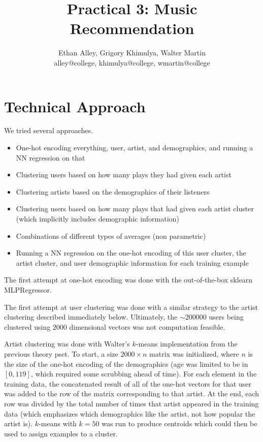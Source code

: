 \documentclass[11pt]{article}
\title{Practical 3: Music Recommendation}
\author{Ethan Alley, Grigory Khimulya, Walter Martin \\ 
alley@college, khimulya@college, wmartin@college }
\begin{document}
\maketitle{}


\section{Technical Approach}

We tried several approaches.
\begin{itemize}
	\item One-hot encoding everything, user, artist, and demographics, and running a NN regression on that
	\item Clustering users based on how many plays they had given each artist
	\item Clustering artists based on the demographics of their listeners
	\item Clustering users based on how many plays that had given each artist cluster (which implicitly includes demographic information)
	\item Combinations of different types of averages (non parametric)
	\item Running a NN regression on the one-hot encoding of this user cluster, the artist cluster, and user demographic information for each training example
\end{itemize}

\noindent The first attempt at one-hot encoding was done with the out-of-the-box sklearn MLPRegressor. 

The first attempt at user clustering was done with a similar strategy to the artist clustering described immediately below. Ultimately, the $\sim200000$ users being clustered using $2000$ dimensional vectors was not computation feasible.

Artist clustering was done with Walter's $k$-means implementation from the previous theory pset. To start, a size $2000 \times n$ matrix was initialized, where $n$ is the size of the one-hot encoding of the demographics (age was limited to be in $[0, 119]$, which required some scrubbing ahead of time). For each element in the training data, the concatenated result of all of the one-hot vectors for that user was added to the row of the matrix corresponding to that artist. At the end, each row was divided by the total number of times that artist appeared in the training data (which emphasizes which demographics like the artist, not how popular the artist is). $k$-means with $k = 50$ was run to produce centroids which could then be used to assign examples to a cluster.
\end{document}
